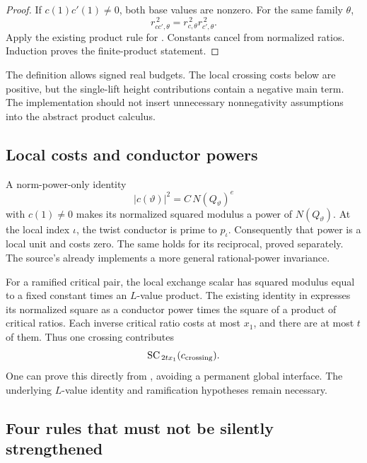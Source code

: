 \begin{proof}
If \(c(1)c'(1)\ne0\), both base values are nonzero. For the same family
\(\theta\),
\[
 r_{cc',\theta}^{\,2}
   =r_{c,\theta}^{\,2}r_{c',\theta}^{\,2}.
\]
Apply the existing product rule for . Constants cancel
from normalized ratios. Induction proves the finite-product statement.
\end{proof}

The definition allows signed real budgets. The local crossing costs below
are positive, but the single-lift height contributions contain a negative
main term. The implementation should not insert unnecessary
nonnegativity assumptions into the abstract product calculus.

\subsection{Local costs and conductor powers}

A norm-power-only identity
\[
 |c(\vartheta)|^2=C\,N(Q_\vartheta)^e
\]
with \(c(1)\ne0\) makes its normalized squared modulus a power of
\(N(Q_\vartheta)\). At the local index \(\iota\), the twist conductor is
prime to \(p_\iota\). Consequently that power is a local unit and costs
zero. The same holds for its reciprocal, proved separately.
The source's  already implements a more general
rational-power invariance.

For a ramified critical pair, the local exchange scalar has squared modulus
equal to a fixed constant times an \(L\)-value product. The existing identity
in 
expresses its normalized square as a conductor power times the square of a
product of critical ratios. Each inverse critical ratio costs at most
\(x_1\), and there are at most \(t\) of them. Thus one crossing contributes
\begin{equation}
 \operatorname{SC}_{\,2tx_1}(c_{\mathrm{crossing}}).
 \label{eq:onecrossing}
\end{equation}
One can prove this directly from
, avoiding a permanent global
 interface. The underlying \(L\)-value identity and
ramification hypotheses remain necessary.

\subsection{Four rules that must not be silently strengthened}

